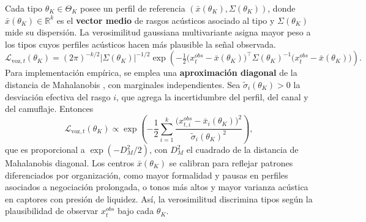 \documentclass[12pt]{article}
\providecommand{\textcite}{\citet}
\theoremstyle{definition}
\theoremstyle{remark}
\newcommand{\1}{\mathbf{1}}
\begin{document}
Cada tipo $\theta_K\in\Theta_K$ posee un perfil de referencia $(\bar{x}(\theta_K),\Sigma(\theta_K))$, donde $\bar{x}(\theta_K)\in\mathbb{R}^k$ es el \textbf{vector medio} de rasgos acústicos asociado al tipo y $\Sigma(\theta_K)$ mide su dispersión. La verosimilitud gaussiana multivariante asigna mayor peso a los tipos cuyos perfiles acústicos hacen más plausible la señal observada.
\begin{equation}
\label{eq:Lvoz-full}
\mathcal{L}_{\mathrm{voz},t}(\theta_K)=(2\pi)^{-k/2}|\Sigma(\theta_K)|^{-1/2}\exp\!\left(-\tfrac{1}{2}\bigl(x_t^{obs}-\bar{x}(\theta_K)\bigr)^\top\Sigma(\theta_K)^{-1}\bigl(x_t^{obs}-\bar{x}(\theta_K)\bigr)\right).
\end{equation}
Para implementación empírica, se emplea una \textbf{aproximación diagonal} de la distancia de Mahalanobis \textcite{Mahalanobis1936}, con marginales independientes. Sea $\tilde{\sigma}_i(\theta_K)>0$ la desviación efectiva del rasgo $i$, que agrega la incertidumbre del perfil, del canal y del camuflaje. Entonces
\begin{equation}
\label{eq:Lvoz-diag}
\mathcal{L}_{\mathrm{voz},t}(\theta_K)\propto\exp\!\left(-\frac{1}{2}\sum_{i=1}^{k}\frac{\bigl(x_{t,i}^{obs}-\bar{x}_i(\theta_K)\bigr)^2}{\tilde{\sigma}_i(\theta_K)^2}\right),
\end{equation}
que es proporcional a $\exp(-D_M^2/2)$, con $D_M^2$ el cuadrado de la distancia de Mahalanobis diagonal. Los centros $\bar{x}(\theta_K)$ se calibran para reflejar patrones diferenciados por organización, como mayor formalidad y pausas en perfiles asociados a negociación prolongada, o tonos más altos y mayor varianza acústica en captores con presión de liquidez. Así, la verosimilitud discrimina tipos según la plausibilidad de observar $x_t^{obs}$ bajo cada $\theta_K$.
\end{document}
